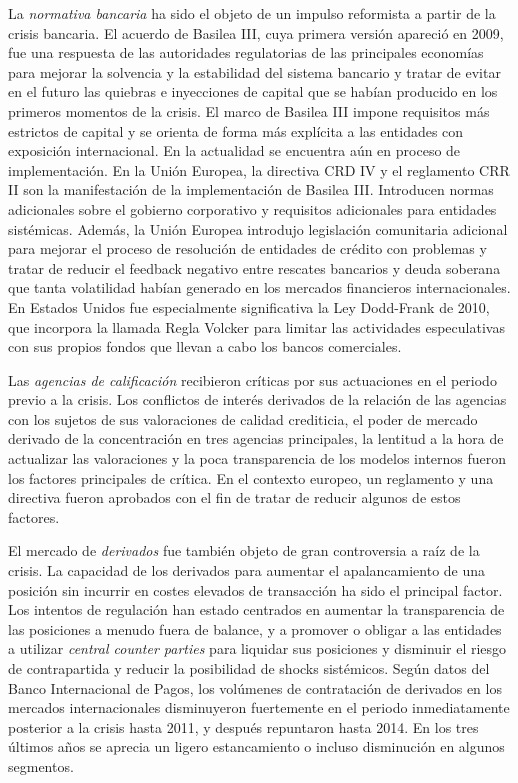 \documentclass{nuevotema}
\begin{document}
La \textit{normativa bancaria} ha sido el objeto de un impulso reformista a partir de la crisis bancaria. El acuerdo de Basilea III, cuya primera versión apareció en 2009, fue una respuesta de las autoridades regulatorias de las principales economías para mejorar la solvencia y la estabilidad del sistema bancario y tratar de evitar en el futuro las quiebras e inyecciones de capital que se habían producido en los primeros momentos de la crisis. El marco de Basilea III impone requisitos más estrictos de capital y se orienta de forma más explícita a las entidades con exposición internacional. En la actualidad se encuentra aún en proceso de implementación. En la Unión Europea, la directiva CRD IV y el reglamento CRR II son la manifestación de la implementación de Basilea III. Introducen normas adicionales sobre el gobierno corporativo y requisitos adicionales para entidades sistémicas. Además, la Unión Europea introdujo legislación comunitaria adicional para mejorar el proceso de resolución de entidades de crédito con problemas y tratar de reducir el feedback negativo entre rescates bancarios y deuda soberana que tanta volatilidad habían generado en los mercados financieros internacionales. En Estados Unidos fue especialmente significativa la Ley Dodd-Frank de 2010, que incorpora la llamada Regla Volcker para limitar las actividades especulativas con sus propios fondos que llevan a cabo los bancos comerciales. 

Las \textit{agencias de calificación} recibieron críticas por sus actuaciones en el periodo previo a la crisis. Los conflictos de interés derivados de la relación de las agencias con los sujetos de sus valoraciones de calidad crediticia, el poder de mercado derivado de la concentración en tres agencias principales, la lentitud a la hora de actualizar las valoraciones y la poca transparencia de los modelos internos fueron los factores principales de crítica. En el contexto europeo, un reglamento y una directiva fueron aprobados con el fin de tratar de reducir algunos de estos factores. 

El mercado de \textit{derivados} fue también objeto de gran controversia a raíz de la crisis. La capacidad de los derivados para aumentar el apalancamiento de una posición sin incurrir en costes elevados de transacción ha sido el principal factor. Los intentos de regulación han estado centrados en aumentar la transparencia de las posiciones a menudo fuera de balance, y a promover o obligar a las entidades a utilizar \textit{central counter parties} para liquidar sus posiciones y disminuir el riesgo de contrapartida y reducir la posibilidad de shocks sistémicos. Según datos del Banco Internacional de Pagos, los volúmenes de contratación de derivados en los mercados internacionales disminuyeron fuertemente en el periodo inmediatamente posterior a la crisis hasta 2011, y después repuntaron hasta 2014. En los tres últimos años se aprecia un ligero estancamiento o incluso disminución en algunos segmentos.
\end{document}
